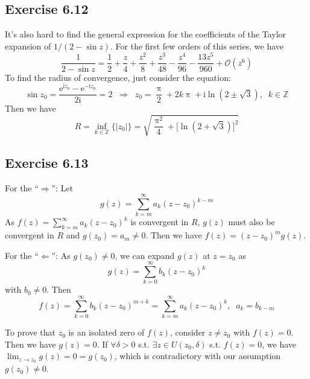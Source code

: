 \documentclass[]{ctexart}
\begin{document}
	\subsection{Exercise 6.12}
	It's also hard to find the general expression for the coefficients of the Taylor expansion of $1/(2-\sin z)$. For the first few orders of this series, we have 
	\begin{equation*}
	\frac{1}{2-\sin z}=\frac 12+\frac z4+\frac{z^2}{8}+\frac{z^3}{48}-\frac{z^4}{96}-\frac{13z^5}{960}+\mathcal{O}(z^6)
	\end{equation*}
	To find the radius of convergence, just consider the equation: 
	\begin{equation*}
	\sin z_0=\frac{\mathrm{e}^{\mathrm{i}z_0}-\mathrm{e}^{-\mathrm{i}z_0}}{2\mathrm{i}}=2\;\;\Rightarrow\;\;z_0=\frac{\uppi}{2}+2k\uppi+\mathrm{i}\ln(2\pm\sqrt{3}),\;\;k\in\mathbb Z
	\end{equation*}
	Then we have 
	\begin{equation*}
	R=\inf_{k\in\mathbb Z}\{|z_0|\}=\sqrt{\frac{\uppi^2}{4}+\big[\ln(2+\sqrt{3})\big]^2}
	\end{equation*}
	\subsection{Exercise 6.13}
	For the “$\Rightarrow$”: Let 
	\begin{equation*}
	g(z)=\sum_{k=m}^{\infty}a_k(z-z_0)^{k-m}
	\end{equation*}
	As $f(z)=\sum_{k=m}^\infty a_k(z-z_0)^k$ is convergent in $R$, $g(z)$ must also be convergent in $R$ and $g(z_0)=a_m\ne 0$. Then we have $f(z)=(z-z_0)^m g(z)$. 
	
	For the “$\Leftarrow$”: As $g(z_0)\ne 0$, we can expand $g(z)$ at $z=z_0$ as 
	\begin{equation*}
	g(z)=\sum_{k=0}^\infty b_k(z-z_0)^k
	\end{equation*}
	with $b_0\ne 0$. Then 
	\begin{equation*}
	f(z)=\sum_{k=0}^\infty b_k(z-z_0)^{m+k}=\sum_{k=m}^\infty a_k(z-z_0)^k,\;\;a_k=b_{k-m}
	\end{equation*}
	
	To prove that $z_0$ is an isolated zero of $f(z)$, consider $z\ne z_0$ with $f(z)=0$. Then we have $g(z)=0$. If $\forall\delta>0$ s.t. $\exists z\in U(z_0,\delta)$ s.t. $f(z)=0$, we have 
	$\lim_{z\to z_0}g(z)=0=g(z_0)$, which is contradictory with our assumption $g(z_0)\ne 0$. 
	
\end{document}
